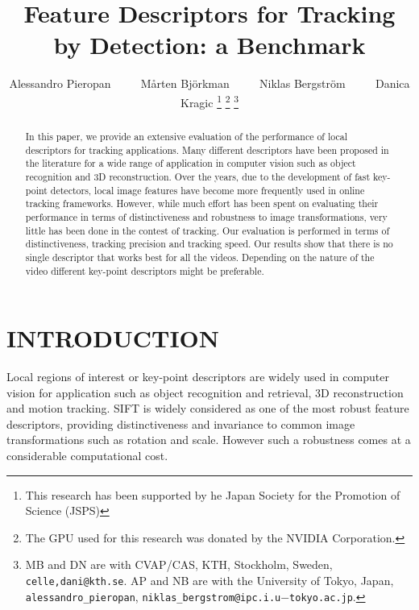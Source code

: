 \documentclass[letterpaper, 10pt, conference]{ieeeconf}
\title{\LARGE \bf Feature Descriptors for Tracking by Detection: a Benchmark}
\author{Alessandro Pieropan ~~~~ Mårten Bj{\"o}rkman  ~~~~ Niklas Bergstr{\"o}m ~~~~ Danica Kragic%
\thanks{This research has been supported by he Japan Society for the Promotion of Science (JSPS)}
\thanks{The GPU used for this research was donated by the NVIDIA Corporation.}
\thanks{MB and DN are with CVAP/CAS, KTH, Stockholm, Sweden, {\tt celle,dani@kth.se}. AP and NB are with the University of Tokyo, Japan, {\tt alessandro\_pieropan}, {\tt niklas\_bergstrom@ipc.i.u$-$tokyo.ac.jp}.}}
\begin{document}
                                                                
                                                                                
\maketitle                                                                      
\thispagestyle{empty}                                                           
\pagestyle{empty}



\begin{abstract}
In this paper, we provide an extensive evaluation of the performance of local descriptors for tracking applications.
Many different descriptors have been proposed in the literature for a wide range of application in computer vision such as object recognition and 3D reconstruction. Over the years, due to the development of fast key-point detectors, local image features have become more frequently used in online tracking frameworks. However, while much effort has been spent on evaluating their performance in terms of distinctiveness and robustness to image transformations, very little has been done in the contest of tracking. Our evaluation is performed in terms of distinctiveness, tracking precision and tracking speed. Our results show that  there is no single descriptor that works best for all the videos. Depending on the nature of the video different key-point descriptors might be preferable. 

\end{abstract}

\section{INTRODUCTION}
\label{sec:introduction}



Local regions of interest or key-point descriptors are widely used in computer vision for application such as object recognition and retrieval, 3D reconstruction and motion tracking. SIFT \cite{lowe04} is widely considered as one of the most robust feature descriptors, providing distinctiveness and invariance to common image transformations such as rotation and scale. However such a robustness comes at a considerable computational cost. 
\end{document}

